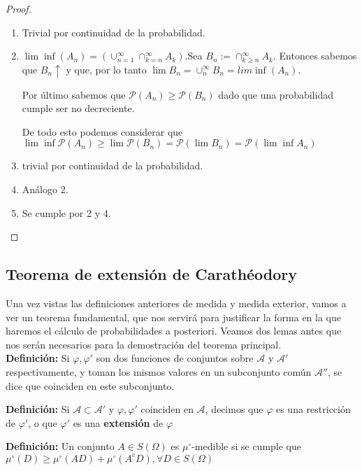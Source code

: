 \begin{proof}
\begin{enumerate} 
  \item Trivial por continuidad de la probabilidad.
  \item $\lim \inf (A_n) = (\cup_{n=1}^\infty\cap_{k=n}^\infty A_k)$.Sea $B_n := \cap_{k\geq n}^\infty A_k$. Entonces sabemos que $B_n \uparrow$ y que, por lo tanto $\lim B_n = \cup_n^\infty B_n = lim \inf (A_n)$. 
  
  Por último sabemos que $\mathcal{P}(A_n) \geq \mathcal{P}(B_n)$ dado que una probabilidad cumple ser  no decreciente.
  
  De todo esto podemos considerar que $\lim \inf \mathcal{P}(A_n) \geq \lim \mathcal{P}(B_n) = \mathcal{P}(\lim B_n) = \mathcal{P}(\lim \inf A_n)$
  
  \item trivial por continuidad de la probabilidad.
  
  \item Análogo 2.
  
  \item Se cumple por 2  y 4.
\end{enumerate}
\end{proof}

\subsection{Teorema de extensión de Carathéodory}

Una vez vistas las definiciones anteriores de medida y medida exterior, vamos a ver un teorema fundamental, que nos servirá para justificar la forma en la que haremos el cálculo de probabilidades a posteriori. Veamos dos lemas antes que nos serán necesarios para la demostración del teorema principal.\\

\textbf{Definición:} Si $\varphi, \varphi'$ son dos funciones de conjuntos sobre $\mathcal{A}$ y $\mathcal{A}'$ respectivamente, y toman los mismos valores en un subconjunto común $\mathcal{A}''$, se dice que coinciden en este subconjunto.

\textbf{Definición:} Si $\mathcal{A} \subset \mathcal{A}'$ y $\varphi, \varphi'$ coinciden en $\mathcal{A}$, decimos que $\varphi$ es una restricción de $\varphi'$, o que $\varphi'$ es una \textbf{extensión} de $\varphi$

\textbf{Definición:} Un conjunto $A\in S(\Omega)$ es $\mu^\circ$-medible si se cumple que $\mu^\circ(D) \geq \mu^\circ(AD)+\mu^\circ(A^cD), \forall D \in S(\Omega)$\\

